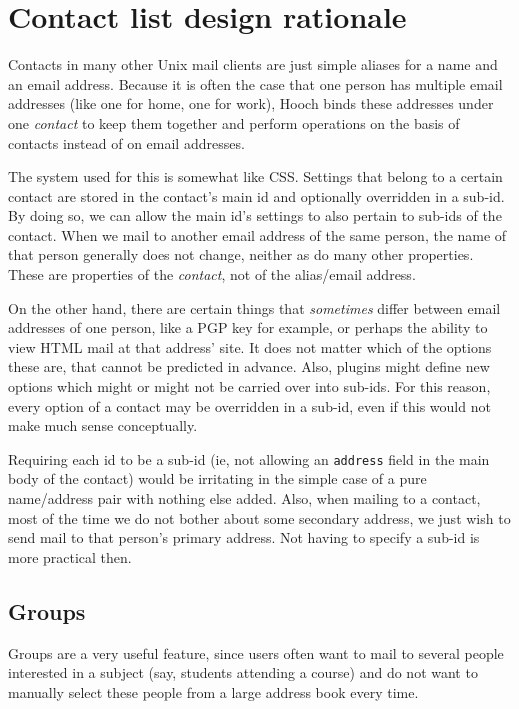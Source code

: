 \documentclass[a4paper]{article}
\begin{document}
\section{Contact list design rationale}

Contacts in many other Unix mail clients are just simple aliases for a
name and an email address.  Because it is often the case that one
person has multiple email addresses (like one for home, one for work),
Hooch binds these addresses under one \emph{contact} to keep them together
and perform operations on the basis of contacts instead of on email
addresses.

The system used for this is somewhat like CSS.  Settings that belong to a
certain contact are stored in the contact's main id and optionally
overridden in a sub-id.  By doing so, we can allow the main id's settings
to also pertain to sub-ids of the contact.  When we mail to another email
address of the same person, the name of that person generally does not
change, neither as do many other properties.  These are properties of
the \emph{contact}, not of the alias/email address.

On the other hand, there are certain things that \emph{sometimes} differ
between email addresses of one person, like a PGP key for example, or
perhaps the ability to view HTML mail at that address' site.  It does not
matter which of the options these are, that cannot be predicted in advance.
Also, plugins might define new options which might or might not be carried
over into sub-ids.  For this reason, every option of a contact may be
overridden in a sub-id, even if this would not make much sense conceptually.

Requiring each id to be a sub-id (ie, not allowing an \texttt{address}
field in the main body of the contact) would be irritating in the simple
case of a pure name/address pair with nothing else added.  Also, when
mailing to a contact, most of the time we do not bother about some
secondary address, we just wish to send mail to that person's primary
address.  Not having to specify a sub-id is more practical then.


\subsection{Groups}

Groups are a very useful feature, since users often want to mail to
several people interested in a subject (say, students attending a course)
and do not want to manually select these people from a large address
book every time.
\end{document}
